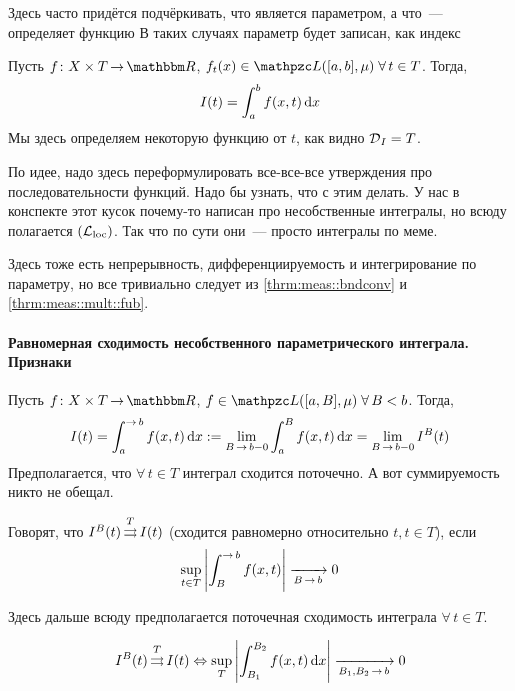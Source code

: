 \documentclass[12pt, timbord]{longnotes}
\begin{document}
Здесь часто придётся подчёркивать, что является параметром, а что~--- определяет функцию
В таких случаях параметр будет записан, как индекс

\begin{defn}\label{defn:meas::paruniconv::prop}
  Пусть $f\colon X \times T \to \R$, $f_t(x)\in \summb([a,b],\mu) \; \forall\, t \in T$. 
  Тогда, 
  \[
    I(t) = \int_a^{b} f(x,t) \, \mathrm{d} x 
  \]
  Мы здесь определяем некоторую функцию от $t$, как видно $\operatorname{\mathcal D}_I = T$.
\end{defn}

По идее, надо здесь переформулировать все-все-все утверждения про последовательности функций.
Надо бы узнать, что с этим делать.
\flame 
У нас в конспекте этот кусок почему-то написан про несобственные интегралы, но всюду полагается
$(\mathcal L_{\rm loc})$. Так что по сути они~--- просто интегралы по меме.

Здесь тоже есть непрерывность, дифференциируемость и интегрирование по параметру, но
все тривиально следует из \ref{thrm:meas::bndconv} и \ref{thrm:meas::mult::fub}.

\paragraph{Равномерная сходимость несобственного параметрического интеграла. Признаки}
\label{par:meas::paruniconv}


\begin{defn}\label{defn:meas::paruniconv::improp}
  Пусть $f\colon X \times T \to \R$,
  $f\in \summb([a,B],\mu) \;\forall\, B <b$. Тогда,
  \[
    I(t) = \int_a^{\to b} f(x,t) \, \del x := \lim_{B\to b-0} \int_a^B f(x,t) \, \del x 
    = \lim_{B\to b-0} I^B(t)
  \]
  Предполагается, что $\forall\, t \in T$ интеграл сходится поточечно. А вот суммируемость
  никто не обещал.
\end{defn}


\begin{defn}\label{defn:meas::paruniconv::uniconv}
  Говорят, что $I^B(t) \mathop{\rightrightarrows}\limits^T I(t)$ (сходится равномерно относительно $t, t\in T$), если 
  \[
    \sup_{t\in T} \left| \int_B^{\to b} f(x,t)\right| \xto{B\to b} 0
  \]
\end{defn}

Здесь дальше всюду предполагается поточечная сходимость интеграла $\forall\, t \in T$.

\begin{thrm}\label{thrm:meas::paruniconv::bk}
  \[
    I^B(t) \unito^T I(t) \Leftrightarrow 
    \sup_{T} \left| \int_{B_1}^{B_2} f(x,t)\, \del x \right| \xto{B_1, B_2 \to b} 0
  \]
\end{thrm}
\end{document}
